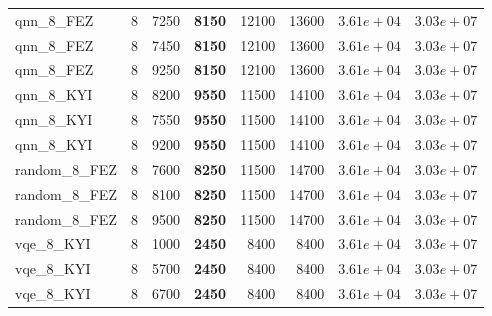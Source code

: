 \begin{table}[ht!]
\begin{tabular}{l c r r r r r r}
qnn\_8\_FEZ & 8 & 7250 & \textbf{8150} & 12100 & 13600 & $3.61e+04$ & $3.03e+07$ \\
qnn\_8\_FEZ & 8 & 7450 & \textbf{8150} & 12100 & 13600 & $3.61e+04$ & $3.03e+07$ \\
qnn\_8\_FEZ & 8 & 9250 & \textbf{8150} & 12100 & 13600 & $3.61e+04$ & $3.03e+07$ \\
qnn\_8\_KYI & 8 & 8200 & \textbf{9550} & 11500 & 14100 & $3.61e+04$ & $3.03e+07$ \\
qnn\_8\_KYI & 8 & 7550 & \textbf{9550} & 11500 & 14100 & $3.61e+04$ & $3.03e+07$ \\
qnn\_8\_KYI & 8 & 9200 & \textbf{9550} & 11500 & 14100 & $3.61e+04$ & $3.03e+07$ \\
random\_8\_FEZ & 8 & 7600 & \textbf{8250} & 11500 & 14700 & $3.61e+04$ & $3.03e+07$ \\
random\_8\_FEZ & 8 & 8100 & \textbf{8250} & 11500 & 14700 & $3.61e+04$ & $3.03e+07$ \\
random\_8\_FEZ & 8 & 9500 & \textbf{8250} & 11500 & 14700 & $3.61e+04$ & $3.03e+07$ \\
vqe\_8\_KYI & 8 & 1000 & \textbf{2450} & 8400 & 8400 & $3.61e+04$ & $3.03e+07$ \\
vqe\_8\_KYI & 8 & 5700 & \textbf{2450} & 8400 & 8400 & $3.61e+04$ & $3.03e+07$ \\
vqe\_8\_KYI & 8 & 6700 & \textbf{2450} & 8400 & 8400 & $3.61e+04$ & $3.03e+07$ \\
\bottomrule
\end{tabular}
\end{table}

